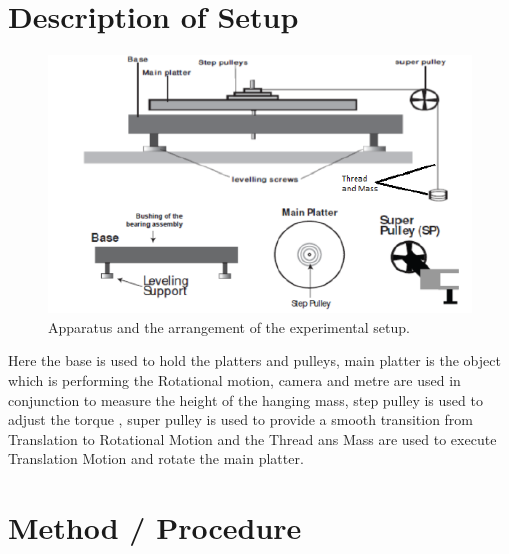\section{Description of Setup}
\newpage
\begin{figure}[h!]
   \centering
    \includegraphics[width=\textwidth]{figures/Apparatus11.png}
    \caption{Apparatus and the arrangement of the experimental setup.}
    \label{fig:yx}
\end{figure}
Here the base is used to hold the platters and pulleys, main platter is the object which is performing the Rotational motion, camera and metre are used in conjunction to measure the height of the hanging mass, step pulley is used to adjust the torque , super pulley is used to provide a smooth transition from Translation to Rotational Motion and the Thread ans Mass are used to execute Translation Motion and rotate the main platter.



\section{Method / Procedure}


